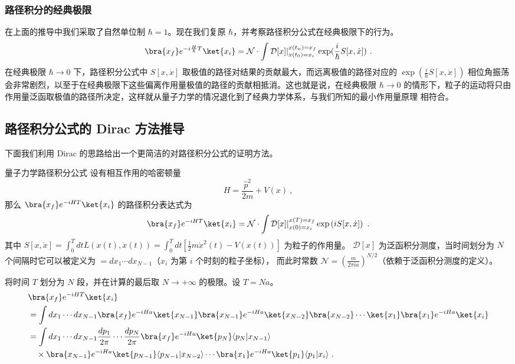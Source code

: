 \subsubsection{路径积分的经典极限}
在上面的推导中我们采取了自然单位制 $\hbar=1$。现在我们复原 $\hbar$，并考察路径积分公式在经典极限下的行为。
\begin{equation}
\bra{x_f} e^{-i\frac{H}{\hbar}T}\ket{x_i}=\mathcal{N}\cdot \int \mathcal{D}[x]|_{x(t_0)=x_i}^{x(t_n)=x_f} \exp(\frac{i}{\hbar}S[x,\dot x])~.
\end{equation}
在经典极限 $\hbar\rightarrow 0$ 下，路径积分公式中 $S[x,\dot x]$ 取极值的路径对结果的贡献最大，而远离极值的路径对应的 $\exp(\frac{i}{\hbar}S[x,\dot x])$ 相位角振荡会非常剧烈，以至于在经典极限下这些偏离作用量极值的路径的贡献相抵消。这也就是说，在经典极限 $\hbar\rightarrow 0$ 的情形下，粒子的运动将只由作用量泛函取极值的路径所决定，这样就从量子力学的情况退化到了经典力学体系，与我们所知的最小作用量原理 相符合。

\subsection{路径积分公式的 Dirac 方法推导}
下面我们利用 Dirac 的思路给出一个更简洁的对路径积分公式的证明方法。
\begin{theorem}{量子力学路径积分公式}\label{the_PIntQM_1}
    设有相互作用的哈密顿量
    \begin{equation}
        H=\frac{\hat p^2}{2m}+V(x)~,
    \end{equation}
    那么 $\bra{x_f}e^{-iHT}\ket{x_i}$ 的路径积分表达式为
    \begin{equation}
        \bra{x_f}e^{-iHT}\ket{x_i}=\mathcal{N}\cdot\int \mathcal D[x]|_{x(0)=x_i}^{x(T)=x_f} \exp\left(iS[x,\dot x]\right)~.
    \end{equation}
    其中 $S[x,\dot x]=\int_0^T d t L(x(t),\dot x(t))=\int_0^T d t \left[\frac{1}{2}m\dot{x}^2(t)-V(x(t))\right]$ 为粒子的作用量。
    $\mathcal D[x]$ 为泛函积分测度，当时间划分为 $N$ 个间隔时它可以被定义为 $=d x_1\cdots d x_{N-1}$（$x_i$ 为第 $i$ 个时刻的粒子坐标），
    而此时常数 $\mathcal N=\left(\frac{m}{2\pi i a}\right)^{N/2}$（依赖于泛函积分测度的定义）。
\end{theorem}

将时间 $T$ 划分为 $N$ 段，并在计算的最后取 $N\rightarrow +\infty$ 的极限。设 $T=Na$。
\begin{equation}
\begin{aligned}
        &\bra{x_f}e^{-iHT}\ket{x_i}\\
        &=\int d x_1\cdots d x_{N-1}
        \bra{x_f}e^{-iH a}\ket{x_{N-1}}\bra{x_{N-1}}e^{-iH a}
        \ket{x_{N-2}}\bra{x_{N-2}}\cdots \ket{x_{1}}\bra{x_{1}}e^{-iH a}\ket{x_i}
        \\
        &=\int d x_1\cdots d x_{N-1}\frac{d p_1}{2\pi} \cdots \frac{d p_N}{2\pi}
        \bra{x_f}e^{-iH a}\ket{p_N}\langle p_N|x_{N-1}\rangle 
        \\
        &\quad \times\bra{x_{N-1}}e^{-iH a}
        \ket{p_{N-1}}\langle p_{N-1}|x_{N-2}\rangle
        \cdots \bra{x_{1}}e^{-iH a}\ket{p_1}\langle p_1 | x_i\rangle~.
\end{aligned}
\end{equation}

